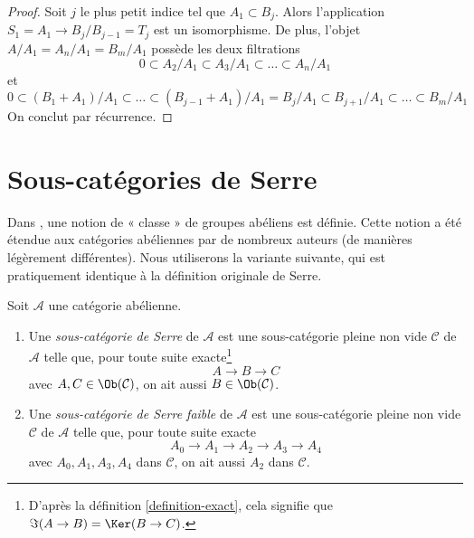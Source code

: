 \begin{proof}
Soit $j$ le plus petit indice tel que $A_1 \subset B_j$.
Alors l'application $S_1 = A_1 \to B_j/B_{j - 1} = T_j$ est un isomorphisme.
De plus, l'objet $A/A_1 = A_n/A_1 = B_m/A_1$
possède les deux filtrations
$$
0 \subset A_2/A_1 \subset A_3/A_1 \subset \ldots \subset A_n/A_1
$$
et
$$
0 \subset (B_1 + A_1)/A_1 \subset \ldots \subset
(B_{j - 1} + A_1)/A_1 = B_j/A_1 \subset B_{j + 1}/A_1
\subset \ldots \subset B_m/A_1
$$
On conclut par récurrence.
\end{proof}






\section{Sous-catégories de Serre}
\label{section-serre-subcategories}

\noindent
Dans \cite[Chapter I, Section 1]{Serre_homotopie_classes},
une notion de « classe » de groupes abéliens est définie.
Cette notion a été étendue aux catégories abéliennes par de nombreux auteurs
(de manières légèrement différentes). Nous utiliserons la variante suivante,
qui est pratiquement identique à la définition originale de Serre.

\begin{definition}
\label{definition-serre-subcategory}
\begin{reference}
\cite[Condition (I) on page 259]{Serre_homotopie_classes}
\end{reference}
Soit $\mathcal{A}$ une catégorie abélienne.
\begin{enumerate}
\item Une {\it sous-catégorie de Serre} de $\mathcal{A}$ est une
sous-catégorie pleine non vide $\mathcal{C}$ de $\mathcal{A}$
telle que, pour toute suite exacte\footnote{D'après la
définition \ref{definition-exact}, cela signifie que $\Im(A \to B) = \Ker(B \to C)$.}
$$
A \to B \to C
$$
avec $A, C \in \Ob(\mathcal{C})$, on ait aussi
$B \in \Ob(\mathcal{C})$.
\item Une {\it sous-catégorie de Serre faible} de $\mathcal{A}$ est une
sous-catégorie pleine non vide $\mathcal{C}$ de $\mathcal{A}$ telle que, pour toute
suite exacte
$$
A_0 \to A_1 \to A_2 \to A_3 \to A_4
$$
avec $A_0, A_1, A_3, A_4$ dans $\mathcal{C}$, on ait aussi $A_2$ dans $\mathcal{C}$.
\end{enumerate}
\end{definition}

